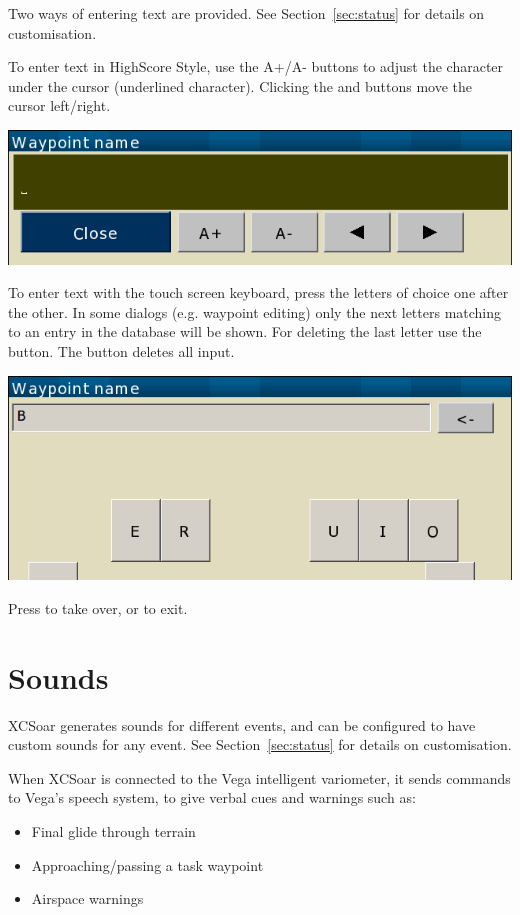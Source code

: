 Two ways of entering text are provided. See Section~\ref{sec:status} for details on customisation.

To enter text in HighScore Style, use the A+/A- buttons to adjust the character under the
cursor (underlined character). Clicking the \button{$<$} and \button{$>$} buttons move the
cursor left/right.  

\begin{center}
\includegraphics[angle=0,width=0.6\linewidth,keepaspectratio='true']{figures/textentry.png}
\end{center}

To enter text with the touch screen keyboard, press the letters of choice one after the other. 
In some dialogs (e.g. waypoint editing) only the next letters matching to an entry in the database 
will be shown. For deleting the last letter use the \button{$<-$} button. The
 button deletes all input.

\begin{center}
\includegraphics[angle=0,width=0.6\linewidth,keepaspectratio='true']{figures/textentry_keyboard.png}
\end{center}

Press  to take over, or  to exit.

\section{Sounds}

XCSoar generates sounds for different events, and can be configured to
have custom sounds for any event.  See Section~\ref{sec:status} for
details on customisation.

When XCSoar is connected to the Vega intelligent variometer, it sends
commands to Vega's speech system, to give verbal cues and warnings such as:
\begin{itemize}
\item Final glide through terrain
\item Approaching/passing a task waypoint
\item Airspace warnings
\end{itemize}

